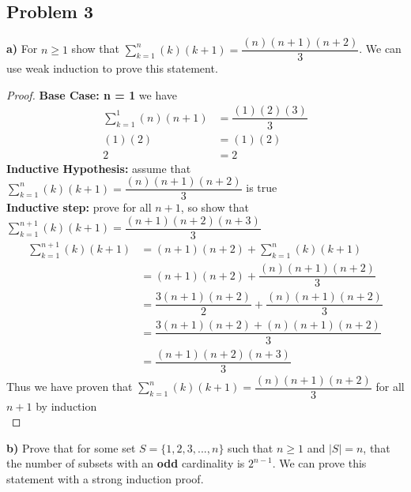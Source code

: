 \documentclass[12pt]{article}
\begin{document}
\subsection*{Problem 3}
\textbf{a)} For $n \geq 1$ show that $\sum_{k = 1}^{n} (k)(k+1) = \dfrac{(n)(n+1)(n+2)}{3}$. We can use weak induction to prove this statement.
\begin{proof}
\textbf{Base Case:  n = 1} we have
\begin{align*}
\sum_{k = 1}^{1} (n)(n+1) &= \dfrac{(1)(2)(3)}{3} \\
(1)(2) &= (1)(2)\\
2 &= 2
\end{align*}
\textbf{Inductive Hypothesis:} assume that $\sum_{k = 1}^{n} (k)(k+1) = \dfrac{(n)(n+1)(n+2)}{3}$ is true\\
\textbf{Inductive step:} prove for all $n+1$, so show that $\sum_{k = 1}^{n+1} (k)(k+1) = \dfrac{(n+1)(n+2)(n+3)}{3}$
\begin{align*}
\sum_{k = 1}^{n+1} (k)(k+1) &= (n+1)(n+2) + \sum_{k = 1}^{n} (k)(k+1)\\
&= (n+1)(n+2) + \dfrac{(n)(n+1)(n+2)}{3}\\
&= \dfrac{3(n+1)(n+2)}{2} + \dfrac{(n)(n+1)(n+2)}{3}\\
&= \dfrac{3(n+1)(n+2) + (n)(n+1)(n+2)}{3}\\
&= \dfrac{(n+1)(n+2)(n+3)}{3}
\end{align*}
Thus we have proven that $\sum_{k = 1}^{n} (k)(k+1) = \dfrac{(n)(n+1)(n+2)}{3}$ for all $n+1$ by induction\\
\end{proof}
\textbf{b)} Prove that for some set $S = \{ 1, 2, 3, ..., n \}$ such that $n \geq 1$ and $|S| = n$, that the number of subsets with an \textbf{odd} cardinality is $2^{n-1}$. We can prove this statement with a strong induction proof.
\end{document}
